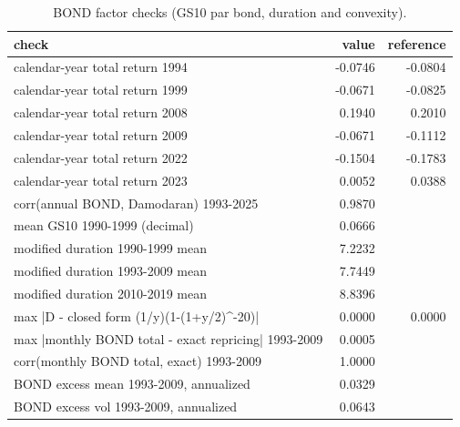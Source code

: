 \begin{table}[htbp]\centering\small
\caption{BOND factor checks (GS10 par bond, duration and convexity).}
\label{tab:m8_bond}
\begin{tabular}{lrr}
\toprule
check & value & reference \\
\midrule
calendar-year total return 1994 & -0.0746 & -0.0804 \\
calendar-year total return 1999 & -0.0671 & -0.0825 \\
calendar-year total return 2008 & 0.1940 & 0.2010 \\
calendar-year total return 2009 & -0.0671 & -0.1112 \\
calendar-year total return 2022 & -0.1504 & -0.1783 \\
calendar-year total return 2023 & 0.0052 & 0.0388 \\
corr(annual BOND, Damodaran) 1993-2025 & 0.9870 &  \\
mean GS10 1990-1999 (decimal) & 0.0666 &  \\
modified duration 1990-1999 mean & 7.2232 &  \\
modified duration 1993-2009 mean & 7.7449 &  \\
modified duration 2010-2019 mean & 8.8396 &  \\
max |D - closed form (1/y)(1-(1+y/2)^-20)| & 0.0000 & 0.0000 \\
max |monthly BOND total - exact repricing| 1993-2009 & 0.0005 &  \\
corr(monthly BOND total, exact) 1993-2009 & 1.0000 &  \\
BOND excess mean 1993-2009, annualized & 0.0329 &  \\
BOND excess vol 1993-2009, annualized & 0.0643 &  \\
\bottomrule
\end{tabular}
\end{table}
